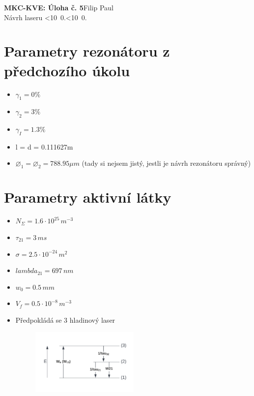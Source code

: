\documentclass[10pt, a4paper]{article}%
\def\mydate{\leavevmode\hbox{\twodigits\day.\twodigits\month.\the\year}}
\def\twodigits#1{\ifnum#1<10 0\fi\the#1}
\begin{document}
\begin{flushleft}%
	\textbf{\Large{MKC-KVE: Úloha č. 5}}\hfill Filip Paul\\
	\large{Návrh laseru \hfill\mydate}

\end{flushleft}
\section*{\Large Parametry rezonátoru z předchozího úkolu}
\begin{itemize}
    \item $\gamma_1 = 0\%$
    \item $\gamma_2 = 3\%$
    \item $\gamma_I = 1.3\%$
    \item l = d = 0.111627m
    \item  $\varnothing_1 = \varnothing_2 = 788.95\mu m$ (tady si nejsem jistý, jestli je návrh rezonátoru správný)

\end{itemize}
\section*{\Large Parametry aktivní látky}
\begin{itemize}
    \item $N_\Sigma = 1.6\cdot 10^{25}\,m^{-3}$
    \item $\tau_{21} = 3\,ms$
    \item $\sigma = 2.5\cdot10^{-24}\,m^2$
    \item $lambda_{21}  = 697\,nm$
    \item $w_0 = 0.5\,mm$
    \item $V_f = 0.5\cdot 10^{-8}\,m^{-3}$

    \item Předpokládá se 3 hladinový laser
    \begin{figure}[ht!]
        \centering
        \includegraphics[width=0.5\textwidth]{3hladinovy.png}
    \end{figure}


\end{itemize}
\end{document}
